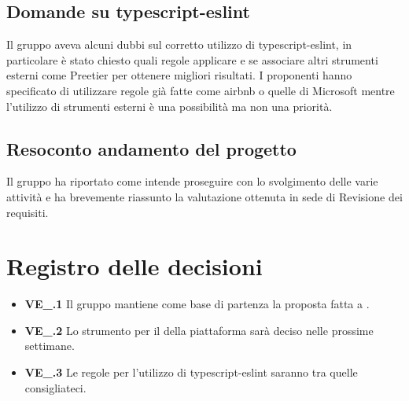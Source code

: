 \subsection{Domande su typescript-eslint}
Il gruppo aveva alcuni dubbi sul corretto utilizzo di typescript-eslint, in particolare è stato chiesto quali regole applicare e se associare altri strumenti esterni come Preetier per ottenere migliori risultati. I proponenti hanno specificato di utilizzare regole già fatte come airbnb o quelle di Microsoft mentre l'utilizzo di strumenti esterni è una possibilità ma non una priorità.
\subsection{Resoconto andamento del progetto}
Il gruppo ha riportato come intende proseguire con lo svolgimento delle varie attività e ha brevemente riassunto la valutazione ottenuta in sede di Revisione dei requisiti. 

\section{Registro delle decisioni}
\begin{itemize}
	\item \textbf{VE\_\Data.1} Il gruppo mantiene come base di partenza la proposta fatta a \Proponente.
   \item \textbf{VE\_\Data.2} Lo strumento per il  della piattaforma sarà deciso nelle prossime settimane.
   \item \textbf{VE\_\Data.3} Le regole per l'utilizzo di typescript-eslint saranno tra quelle consigliateci.
\end{itemize}
